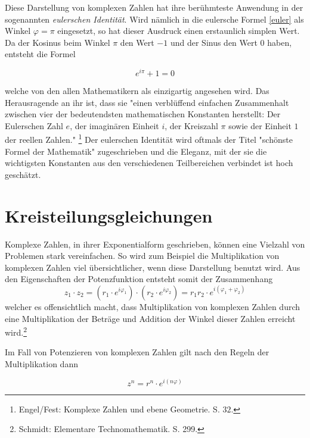 \documentclass[a4paper,12pt]{article} %
\begin{document}
Diese Darstellung von komplexen Zahlen hat ihre berühmteste Anwendung in der sogenannten \emph{eulerschen Identität}.
Wird nämlich in die eulersche Formel \eqref{euler} als Winkel $\varphi=\pi$ eingesetzt, so hat dieser Ausdruck einen erstaunlich simplen Wert.
Da der Kosinus beim Winkel $\pi$ den Wert $-1$ und der Sinus den Wert $0$ haben, entsteht die Formel

\begin{equation}
	\boxed{e^{i\pi}+1=0}
\end{equation}

\noindent welche von den allen Mathematikern als einzigartig angesehen wird.
Das Herausragende an ihr ist, dass sie "{}einen verblüffend einfachen Zusammenhalt zwischen vier der bedeutendsten mathematischen Konstanten herstellt:
Der Eulerschen Zahl $e$, der imaginären Einheit $i$, der Kreiszahl $\pi$ sowie der Einheit $1$ der reellen Zahlen."
\footnote{Engel/Fest: Komplexe Zahlen und ebene Geometrie. S. $32$.}
Der eulerschen Identität wird oftmals der Titel "{}schönste Formel der Mathematik"{} zugeschrieben und die Eleganz, mit der sie die wichtigsten Konstanten aus den verschiedenen Teilbereichen verbindet ist hoch geschätzt.\\



\section{Kreisteilungsgleichungen}



Komplexe Zahlen, in ihrer Exponentialform geschrieben, können eine Vielzahl von Problemen stark vereinfachen.
So wird zum Beispiel die Multiplikation von komplexen Zahlen viel übersichtlicher, wenn diese Darstellung benutzt wird.
Aus den Eigenschaften der Potenzfunktion entsteht somit der Zusammenhang
\[z_1\cdot z_2=(r_1 \cdot e^{i\varphi_1}) \cdot (r_2 \cdot e^{i\varphi_2})=r_1 r_2 \cdot e^{i(\varphi_1+\varphi_2)}\]
welcher es offensichtlich macht, dass Multiplikation von komplexen Zahlen durch eine Multiplikation der Beträge und Addition der Winkel dieser Zahlen erreicht wird.\footnote{Schmidt: Elementare Technomathematik. S. 299.}

Im Fall von Potenzieren von komplexen Zahlen gilt nach den Regeln der Multiplikation dann

\begin{equation}\label{potenz}
	z^n=r^n \cdot e^{i(n\varphi)}
\end{equation}
\end{document}
